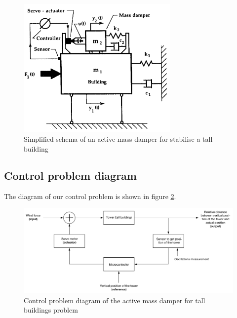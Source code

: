 \documentclass[a4paper, 12pt]{article}
\begin{document}
    \begin{figure}[!ht]
        \centering
        \includegraphics[width=0.7\textwidth]{resources/pdf/schema.pdf}
        \caption{Simplified schema of an active mass damper for stabilise a tall building\cite{sciencedirect_amd_2}}
        \label{fig:schema}
    \end{figure}
    
    \subsection{Control problem diagram}
    The diagram of our control problem is shown in figure \ref{fig:diagram}.
    \begin{figure}[!ht]
        \centering
        \includegraphics[width=1\textwidth]{resources/pdf/diagram.pdf}
        \caption{Control problem diagram of the active mass damper for tall buildings problem}
        \label{fig:diagram}
    \end{figure}
    
\end{document}
